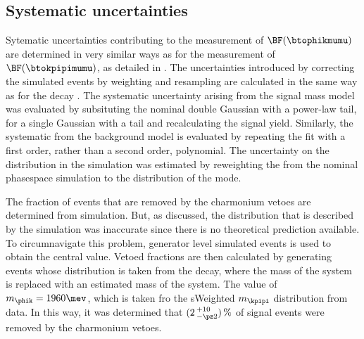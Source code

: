 

\subsection{Systematic uncertainties}
\label{ssec:phik:syst}

Sytematic uncertainties contributing to the measurement of $\BF(\btophikmumu)$ are determined in
very similar ways as for the measurement of $\BF(\btokpipimumu)$, as detailed in
.
The uncertainties introduced by correcting the simulated events by weighting and resampling are
calculated in the same way as for the decay \btokpipimumu.
The systematic uncertainty arising from the signal mass model was evaluated by
subsituting the nominal double Gaussian with a power-law tail, for a single Gaussian with a tail
and recalculating the signal yield.
Similarly, the systematic from the background model is evaluated by repeating the fit with a first
order, rather than a second order, polynomial.
The uncertainty on the \qsq distribution in the simulation was estimated by reweighting the from
the nominal phasespace simulation to the distribution of the  mode.

The fraction of events that are removed by the charmonium vetoes are determined from simulation.
But, as discussed, the \qsq distribution that is described by the \btophikmumu simulation was
inaccurate since there is no theoretical prediction available.
To circumnavigate this problem, generator level simulated events is used to obtain the central
value.
Vetoed fractions are then calculated by generating events whose \qsq distribution is taken from the
 decay, where the mass of the  system is replaced with an
estimated mass of the \phik system.
The value of $m_{\phik}=1960\mev$, which is taken fro the sWeighted $m_{\kpipi}$ distribution from
data.
In this way, it was determined that $(2\,^{+10}_{-\pz2})\,\%$ of signal events were removed by the
charmonium vetoes.


